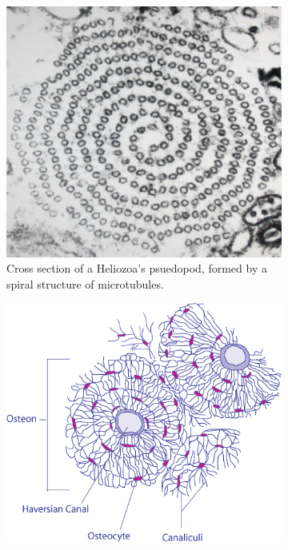 \begin{figure}\centering
\begin{subfigure}{.31\linewidth}\centering
  \includegraphics[width=\linewidth]{img/Axopodium_Mikrotubuli}
  \caption{Cross section of a Heliozoa's psuedopod, formed by a spiral structure of microtubules.}
  \label{fig:microtubule}
\end{subfigure}\hfill
\begin{subfigure}{.31\linewidth}\centering
  \includegraphics[width=\linewidth]{img/Transverse_Section_Of_Bone}

\end{subfigure}
\end{figure}
